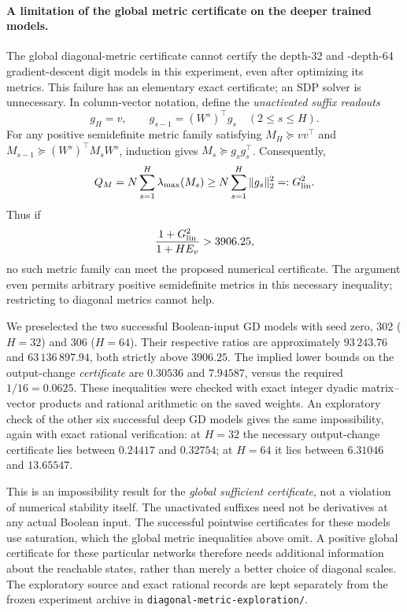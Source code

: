 \paragraph{A limitation of the global metric certificate on the deeper trained models.}
The global diagonal-metric certificate cannot certify the depth-32 and
-depth-64 gradient-descent digit models in this experiment, even after
optimizing its metrics. This failure has an elementary exact certificate;
an SDP solver is unnecessary. In column-vector notation, define the
\emph{unactivated suffix readouts}
\[
 g_H=v,\qquad g_{s-1}=(W^s)^\top g_s\quad(2\le s\le H).
\]
For any positive semidefinite metric family satisfying
$M_H\succeq vv^\top$ and
$M_{s-1}\succeq(W^s)^\top M_sW^s$, induction gives
$M_s\succeq g_sg_s^\top$. Consequently,
\[
 Q_M=N\sum_{s=1}^H\lambda_{\max}(M_s)
       \ge N\sum_{s=1}^H\|g_s\|_2^2=:G_{\rm lin}^2.
\]
Thus if
\[
 \frac{1+G_{\rm lin}^2}{1+H E_v}>3906.25,
\]
no such metric family can meet the proposed numerical certificate.
The argument even permits arbitrary positive semidefinite metrics in this
necessary inequality; restricting to diagonal metrics cannot help.

We preselected the two successful Boolean-input GD models with seed zero,
302 ($H=32$) and 306 ($H=64$). Their respective ratios are approximately
$93\,243.76$ and $63\,136\,897.94$, both strictly above $3906.25$.
The implied lower bounds on the output-change \emph{certificate} are
$0.30536$ and $7.94587$, versus the required $1/16=0.0625$.
These inequalities were checked with exact integer dyadic matrix--vector
products and rational arithmetic on the saved weights. An exploratory
check of the other six successful deep GD models gives the same
impossibility, again with exact rational verification: at $H=32$ the
necessary output-change certificate lies between $0.24417$ and $0.32754$;
at $H=64$ it lies between $6.31046$ and $13.65547$.

This is an impossibility result for the \emph{global sufficient certificate},
not a violation of numerical stability itself. The unactivated suffixes
need not be derivatives at any actual Boolean input. The successful
pointwise certificates for these models use saturation, which the global
metric inequalities above omit. A positive global certificate for these
particular networks therefore needs additional information about the
reachable states, rather than merely a better choice of diagonal scales.
The exploratory source and exact rational records are kept separately
from the frozen experiment archive in
\texttt{diagonal-metric-exploration/}.
